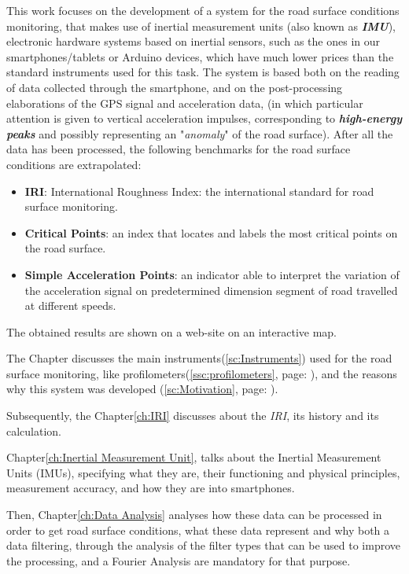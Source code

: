 \documentclass[tesi]{subfiles}
\begin{document}
This work focuses on the development of a system for the road surface conditions monitoring, that makes use of inertial measurement units (also known as \textbf{\textit{IMU}}), electronic hardware systems based on inertial sensors, such as the ones in our smartphones/tablets or Arduino devices, which have much lower prices than the standard instruments used for this task.
The system is based both on the reading of data collected through the smartphone, and on the post-processing elaborations of the GPS signal and acceleration data, (in which particular attention is given to vertical acceleration impulses, corresponding to \textbf{\textit{high-energy peaks}} and possibly representing an "\textit{anomaly}" of the road surface).
After all the data has been processed, the following benchmarks for the road surface conditions are extrapolated:
\begin{itemize}\label{it:indexes}
\item \textbf{IRI}: International Roughness Index: the international standard for road surface monitoring.
\item \textbf{Critical Points}: an index that locates and labels the most critical points on the road surface.
\item \textbf{Simple Acceleration Points}: an indicator able to interpret the variation of the acceleration signal on predetermined dimension segment of road travelled at different speeds.
\end{itemize}

The obtained results are shown on a web-site on an interactive map.

The  Chapter discusses the main instruments{\footnotesize (\ref{sc:Instruments})} used for the road surface monitoring, like profilometers{\footnotesize (\ref{ssc:profilometers}, page: \pageref{ssc:profilometers})}, and the reasons why this system was developed  {\footnotesize (\ref{sc:Motivation}, page: \pageref{sc:Motivation})}.


Subsequently, the Chapter\ref{ch:IRI} discusses about the \textit{IRI}, its history and its calculation.


Chapter\ref{ch:Inertial Measurement Unit}, talks about the Inertial Measurement Units (IMUs), specifying what they are, their functioning and physical principles, measurement accuracy, and how they are into smartphones.


Then, Chapter\ref{ch:Data Analysis} analyses  how these data can be processed in order to get road surface conditions, what these data represent and why both a data filtering, through the analysis of the filter types that can be used to improve the processing, and a Fourier Analysis are mandatory for that purpose.
\end{document}
